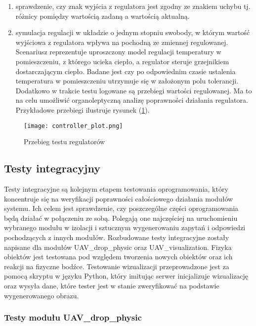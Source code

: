 \begin{enumerate}
\item sprawdzenie, czy znak wyjścia z regulatora jest zgodny ze znakiem uchybu tj. różnicy pomiędzy wartością zadaną a wartością aktualną.
\item symulacja regulacji w układzie o jednym stopniu swobody, w którym wartość wyjściowa z regulatora wpływa na pochodną ze zmiennej regulowanej. Scenariusz reprezentuje uproszczony model regulacji temperatury w pomieszczeniu, z którego ucieka ciepło, a regulator steruje grzejnikiem dostarczającym ciepło. Badane jest czy po odpowiednim czasie ustalenia temperatura w pomieszczeniu utrzymuje się w założonym polu tolerancji. Dodatkowo w trakcie testu logowane są przebiegi wartości regulowanej. Ma to na celu umożliwić organoleptyczną analizę poprawności działania regulatora. Przykładowe przebiegi ilustruje rysunek (\ref{controller_plot}).
\end{enumerate}

\begin{figure}[!th]
	\centering
	\texttt{[image: controller\_plot.png]}
	\caption{Przebieg testu regulatorów}
	\label{controller_plot}
\end{figure}
\newpage

\subsection{Testy integracyjny}

Testy integracyjne są kolejnym etapem testowania oprogramowania, który koncentruje się na weryfikacji poprawności całościowego działania modułów systemu. Ich celem jest sprawdzenie, czy poszczególne części oprogramowania będą działać w połączeniu ze sobą. Polegają one najczęściej na uruchomieniu wybranego modułu w izolacji i sztucznym wygenerowaniu zapytań i odpowiedzi pochodzących z innych modułów. Rozbudowane testy integracyjne zostały napisane dla modułów UAV\_drop\_physic oraz UAV\_visualization. Fizyka obiektów jest testowana pod względem tworzenia nowych obiektów oraz ich reakcji na fizyczne bodźce. Testowanie wizualizacji przeprowadzone jest za pomocą skryptu w języku Python, który imitując serwer inicjalizuje wizualizację oraz wysyła dane, które tester jest w stanie zweryfikować na podstawie wygenerowanego obrazu.

\subsubsection{Testy modułu UAV\_drop\_physic}

